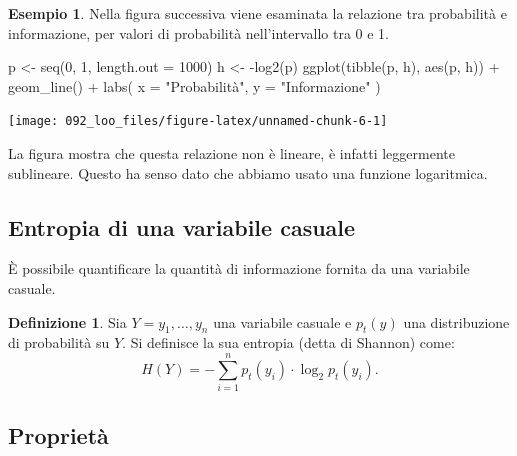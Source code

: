 \documentclass[
  10pt,
  italian,
  a4paper,
  extrafontsizes,onecolumn,openright
  ]{memoir}
\newenvironment{Shaded}{\begin{snugshade}}{\end{snugshade}}
\newcommand{\AttributeTok}[1]{\textcolor[rgb]{0.77,0.63,0.00}{#1}}
\newcommand{\DecValTok}[1]{\textcolor[rgb]{0.00,0.00,0.81}{#1}}
\newcommand{\FunctionTok}[1]{\textcolor[rgb]{0.00,0.00,0.00}{#1}}
\newcommand{\NormalTok}[1]{#1}
\newcommand{\OtherTok}[1]{\textcolor[rgb]{0.56,0.35,0.01}{#1}}
\newcommand{\SpecialCharTok}[1]{\textcolor[rgb]{0.00,0.00,0.00}{#1}}
\newcommand{\StringTok}[1]{\textcolor[rgb]{0.31,0.60,0.02}{#1}}
\theoremstyle{definition}
\newtheorem{definition}{Definizione}[chapter]
\theoremstyle{definition}
\newtheorem{example}{Esempio}[chapter]
\theoremstyle{definition}
\theoremstyle{definition}
\theoremstyle{remark}
\begin{document}
\begin{example}
Nella figura successiva viene esaminata la relazione tra probabilità e informazione, per valori di probabilità nell'intervallo tra 0 e 1.

\begin{Shaded}
\begin{Highlighting}[]
\NormalTok{p }\OtherTok{\textless{}{-}} \FunctionTok{seq}\NormalTok{(}\DecValTok{0}\NormalTok{, }\DecValTok{1}\NormalTok{, }\AttributeTok{length.out =} \DecValTok{1000}\NormalTok{)}
\NormalTok{h }\OtherTok{\textless{}{-}} \SpecialCharTok{{-}}\FunctionTok{log2}\NormalTok{(p)}
\FunctionTok{ggplot}\NormalTok{(}\FunctionTok{tibble}\NormalTok{(p, h), }\FunctionTok{aes}\NormalTok{(p, h)) }\SpecialCharTok{+}
  \FunctionTok{geom\_line}\NormalTok{() }\SpecialCharTok{+}
  \FunctionTok{labs}\NormalTok{(}
    \AttributeTok{x =} \StringTok{"Probabilità"}\NormalTok{,}
    \AttributeTok{y =} \StringTok{"Informazione"}
\NormalTok{  )}
\end{Highlighting}
\end{Shaded}

\begin{center}\texttt{[image: 092\_loo\_files/figure-latex/unnamed-chunk-6-1]} \end{center}

\noindent
La figura mostra che questa relazione non è lineare, è infatti leggermente sublineare. Questo ha senso dato che abbiamo usato una funzione logaritmica.
\end{example}

\hypertarget{entropia-di-una-variabile-casuale}{%
\subsection{Entropia di una variabile casuale}\label{entropia-di-una-variabile-casuale}}

È possibile quantificare la quantità di informazione fornita da una variabile casuale.

\begin{definition}
Sia \(Y = y_1, \dots, y_n\) una variabile casuale e \(p_t(y)\) una distribuzione di probabilità su \(Y\). Si definisce la sua entropia (detta di Shannon) come:
\begin{equation}
H(Y) = - \sum_{i=1}^n p_t(y_i) \cdot \log_2 p_t(y_i).
\label{eq:entropy}
\end{equation}
\end{definition}

\hypertarget{proprietuxe0}{%
\subsection{Proprietà}\label{proprietuxe0}}
\end{document}
